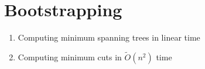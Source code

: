 \section{Bootstrapping}

\begin{tcolorbox}[title=Sections, colback=blue!10, colframe=blue]
    \begin{enumerate}
        \item Computing minimum spanning trees in linear time
        \item Computing minimum cuts in $\tilde{O}(n^2)$ time
    \end{enumerate}
\end{tcolorbox}

\newpage